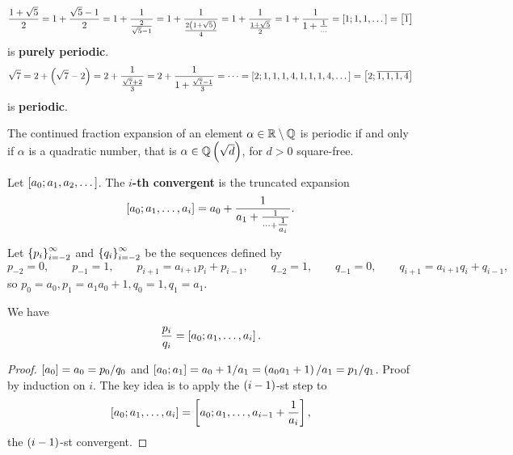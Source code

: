 \pagebreak

\begin{example*}
$$ \dfrac{1 + \sqrt{5}}{2} = 1 + \dfrac{\sqrt{5} - 1}{2} = 1 + \dfrac{1}{\tfrac{2}{\sqrt{5} - 1}} = 1 + \dfrac{1}{\tfrac{2\br{1 + \sqrt{5}}}{4}} = 1 + \dfrac{1}{\tfrac{1 + \sqrt{5}}{2}} = 1 + \dfrac{1}{1 + \tfrac{1}{\dots}} = \sbr{1; 1, 1, \dots} = \sbr{\overline{1}} $$
is \textbf{purely periodic}.
$$ \sqrt{7} = 2 + \br{\sqrt{7} - 2} = 2 + \dfrac{1}{\tfrac{\sqrt{7} + 2}{3}} = 2 + \dfrac{1}{1 + \tfrac{\sqrt{7} - 1}{3}} = \dots = \sbr{2; 1, 1, 1, 4, 1, 1, 1, 4, \dots} = \sbr{2; \overline{1, 1, 1, 4}} $$
is \textbf{periodic}.
\end{example*}

\begin{theorem}
The continued fraction expansion of an element $ \alpha \in \mathbb{R} \setminus \mathbb{Q} $ is periodic if and only if $ \alpha $ is a quadratic number, that is $ \alpha \in \Q\br{\sqrt{d}} $, for $ d > 0 $ square-free.
\end{theorem}


\begin{definition}
Let $ \sbr{a_0; a_1, a_2, \dots} $. The \textbf{$ i $-th convergent} is the truncated expansion
$$ \sbr{a_0; a_1, \dots, a_i} = a_0 + \dfrac{1}{a_1 + \tfrac{1}{\dots + \tfrac{1}{a_i}}}. $$
\end{definition}

\begin{definition}
Let $ \cbr{p_i}_{i = -2}^\infty $ and $ \cbr{q_i}_{i = -2}^\infty $ be the sequences defined by
$$ p_{-2} = 0, \qquad p_{-1} = 1, \qquad p_{i + 1} = a_{i + 1}p_i + p_{i - 1}, \qquad q_{-2} = 1, \qquad q_{-1} = 0, \qquad q_{i + 1} = a_{i + 1}q_i + q_{i - 1}, $$
so $ p_0 = a_0, p_1 = a_1a_0 + 1, q_0 = 1, q_1 = a_1 $.
\end{definition}

\begin{lemma}
We have
$$ \dfrac{p_i}{q_i} = \sbr{a_0; a_1, \dots, a_i}. $$
\end{lemma}

\begin{proof}
$ \sbr{a_0} = a_0 = p_0 / q_0 $ and $ \sbr{a_0; a_1} = a_0 + 1 / a_1 = \br{a_0a_1 + 1} / a_1 = p_1 / q_1 $. Proof by induction on $ i $. The key idea is to apply the $ \br{i - 1} $-st step to
$$ \sbr{a_0; a_1, \dots, a_i} = \sbr{a_0; a_1, \dots, a_{i - 1} + \dfrac{1}{a_i}}, $$
the $ \br{i - 1} $-st convergent.
\end{proof}

